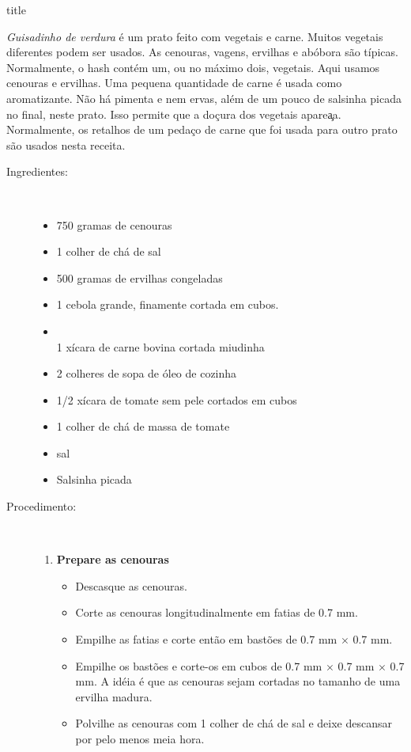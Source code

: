 \documentclass [11pt, letterpaper] {article}
\begin{document}
 {title}

{\it Guisadinho de verdura} é um prato feito com vegetais e carne. Muitos vegetais diferentes podem ser usados. As cenouras, vagens, ervilhas e abóbora são típicas. Normalmente, o hash contém um, ou no máximo dois, vegetais. Aqui usamos cenouras e ervilhas. Uma pequena quantidade de carne é usada como aromatizante. Não há pimenta e nem ervas, além de um pouco de salsinha picada no final, neste prato. Isso permite que a doçura dos vegetais apare\c{a}a. Normalmente, os retalhos de um pedaço de carne que foi usada para outro prato são usados nesta receita.

\vspace {.3in}
\begin {description}

\item [Ingredientes:] \ \\
\begin {itemize}
\item 750 gramas de cenouras
\item 1 colher de chá de sal
\item 500 gramas de ervilhas congeladas
\item 1 cebola grande, finamente cortada em cubos.
\item\ \\ 1 xícara de carne bovina cortada miudinha
\item 2 colheres de sopa de óleo de cozinha
\item 1/2 xícara de tomate sem pele cortados em cubos
\item 1 colher de chá de massa de tomate
\item sal
\item Salsinha picada
\end {itemize}

\item [Procedimento:] \ \\

\begin {enumerate}
\item {\bf Prepare as cenouras}
\begin {itemize}
\item Descasque as cenouras.
\item Corte as cenouras longitudinalmente em fatias de 0.7 mm.
\item Empilhe as fatias e corte então em bastões de 0.7 mm $\times$ 0.7 mm.
\item Empilhe os bastões e corte-os em cubos de 0.7 mm $\times$ 0.7 mm $\times$ 0.7 mm. A id\'eia \'e que as cenouras  sejam cortadas no tamanho de uma ervilha madura.
\item Polvilhe as cenouras com 1 colher de chá de sal e deixe descansar por pelo menos meia hora.
\end {itemize}


\end{enumerate}
\end{description}
\end{document}
